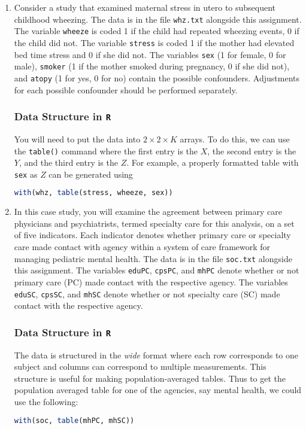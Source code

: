 \documentclass{article}
\newcommand{\R}{\texttt{R}}
\begin{document}
	\begin{enumerate}
		\item Consider a study that examined maternal stress in utero to subsequent childhood wheezing. The data is in the file \texttt{whz.txt} alongside this assignment. The variable \texttt{wheeze} is coded 1 if the child had repeated wheezing events, 0 if the child did not. The variable \texttt{stress} is coded 1 if the mother had elevated bed time stress and 0 if she did not. The variables \texttt{sex} (1 for female, 0 for male), \texttt{smoker} (1 if the mother smoked during pregnancy, 0 if she did not), and \texttt{atopy} (1 for yes, 0 for no) contain the possible confounders. Adjustments for each possible confounder should be performed separately.
	
	\subsubsection*{Data Structure in \R}
	
	You will need to put the data into $2\times2\times K$ arrays. To do this, we can use the \texttt{table()} command where the first entry is the $X$, the second entry is the $Y$, and the third entry is the $Z$. For example, a properly formatted table with \texttt{sex} as $Z$ can be generated using
	\begin{lstlisting}[language = R]
with(whz, table(stress, wheeze, sex))
	\end{lstlisting}

	
	\item In this case study, you will examine the agreement between primary care physicians and psychiatrists, termed specialty care for this analysis, on a set of five indicators. Each indicator denotes whether primary care or specialty care made contact with agency within a system of care framework for managing pediatric mental health. The data is in the file \texttt{soc.txt} alongside this assignment. The variables \texttt{eduPC}, \texttt{cpsPC}, and \texttt{mhPC} denote whether or not primary care (PC) made contact with the respective agency. The variables \texttt{eduSC}, \texttt{cpsSC}, and \texttt{mhSC} denote whether or not specialty care (SC) made contact with the respective agency.

	\subsubsection*{Data Structure in \R}
	
	The data is structured in the \emph{wide} format where each row corresponds to one subject and columns can correspond to multiple measurements. This structure is useful for making population-averaged tables. Thus to get the population averaged table for one of the agencies, say mental health, we could use the following:
	\begin{lstlisting}[language = R]
with(soc, table(mhPC, mhSC))
	\end{lstlisting}


\end{enumerate}
\end{document}
